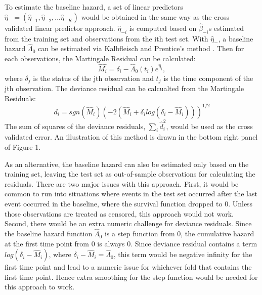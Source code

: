 To estimate the baseline hazard, a set of linear predictors $\hat{\eta}_{-} = ( \hat{\eta}_{-1},  \hat{\eta}_{-2} , ...  \hat{\eta}_{-K})$ would be obtained in the same way as the cross validated linear predictor approach. $\hat{\eta}_{-i}$ is computed based on $\hat{\beta}_{-i}$s estimated from the training set and observations from the ith test set. With $\hat{\eta}_{-}$, a baseline hazard $\hat{\Lambda}_{0}$ can be estimated via Kalbfleisch and Prentice's method \citep{Kalbfleisch2011}. Then for each observations, the Martingale Residual can be calculated: \begin{equation}\hat{M_{i}} = \delta_{i} -\hat{\Lambda}_{0}(t_{i})e^{\hat{\eta}_{i}},\end{equation} where $\delta_{j}$ is the status of the jth observation and $t_{j}$ is the time component of the jth observation. The deviance residual can be calcualted from the Martingale Residuals: \begin{equation} d_{i} = sgn(\hat{M}_{i})(-2(\hat{M}_{i} + \delta_{i}log(\delta_{i} - \hat{M}_{i})))^{1/2}\end{equation} The sum of squares of the deviance residuals, $\sum_{i}\hat{d}_{i}^2$, would be used as the cross validated error. An illustration of this method is drawn in the bottom right panel of Figure 1.

As an alternative, the baseline hazard can also be estimated only based on the training set, leaving the test set as out-of-sample observations for calculating the residuals. There are two major issues with this approach. First, it would be common to run into situations where events in the test set occurred after the last event occurred in the baseline, where the survival function dropped to 0. Unless those observations are treated as censored, this approach would not work. Second, there would be an extra numeric challenge for deviance residuals. Since the baseline hazard function $\hat{\Lambda}_{0}$ is a step function from 0, the cumulative hazard at the first time point from 0 is always 0. Since deviance residual contains a term $log(\delta_{i} - \hat{M}_{i})$, where $\delta_{i} - \hat{M}_{i} = \hat{\Lambda}_{0}$, this term would be negative infinity for the first time point and lead to a numeric issue for whichever fold that contains the first time point. Hence extra smoothing for the step function would be needed for this approach to work.

